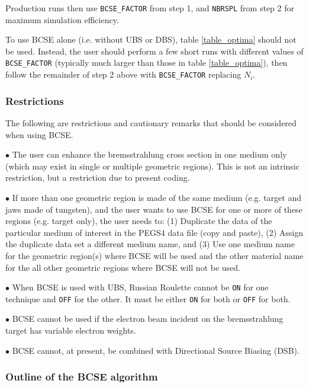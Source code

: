 \documentclass[12pt,twoside]{article}
\begin{document}
\noindent Production runs then use {\tt BCSE\_FACTOR} from step 1, and
{\tt NBRSPL} from step 2 for maximum simulation efficiency.

\noindent To use BCSE alone (i.e. without UBS or DBS), table
\ref{table_optima} should not be used. Instead, the user should
perform a few short runs with different values of {\tt BCSE\_FACTOR}
(typically much larger than those in table \ref{table_optima}), then
follow the remainder of step 2 above with {\tt BCSE\_FACTOR} replacing
$N_{i}$.

\subsubsection{Restrictions \label{BCSE_restrictions}}

The following are restrictions and cautionary remarks that should be
considered when using BCSE.

\noindent $\bullet$ The user can enhance the bremsstrahlung cross
section in one medium only (which may exist in single or multiple
geometric regions). This is not an intrinsic restriction, but a restriction
due to present coding.

\noindent $\bullet$ If more than one geometric region is made of the
same medium (e.g. target and jaws made of tungsten), and the user wants
to use BCSE for one or more of these regions (e.g. target only), the
user needs to: (1) Duplicate the data of the particular medium of
interest in the PEGS4 data file (copy and paste), (2) Assign the
duplicate data set a different medium name, and (3) Use one medium
name for the geometric region(s) where BCSE will be used and the other
material name for the all other geometric regions where BCSE will not
be used.

\noindent $\bullet$ When BCSE is used with UBS, Russian Roulette
cannot be {\tt ON} for one technique and {\tt OFF} for the other. It
must be either {\tt ON} for both or {\tt OFF} for both.

\noindent $\bullet$ BCSE cannot be used if the electron beam incident
on the bremsstrahlung target has variable electron weights.

\noindent $\bullet$ BCSE cannot, at present, be combined with
Directional Source Biasing (DSB).

\subsubsection{Outline of the BCSE algorithm}
\end{document}
